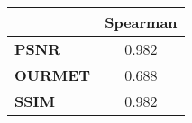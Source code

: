 \begin{tabular}{|l|c|}
\hline
&\textbf{Spearman}\\\hline
\textbf{PSNR}&0.982\\\hline
\textbf{OURMET}&0.688\\\hline
\textbf{SSIM}&0.982\\\hline
\end{tabular}
